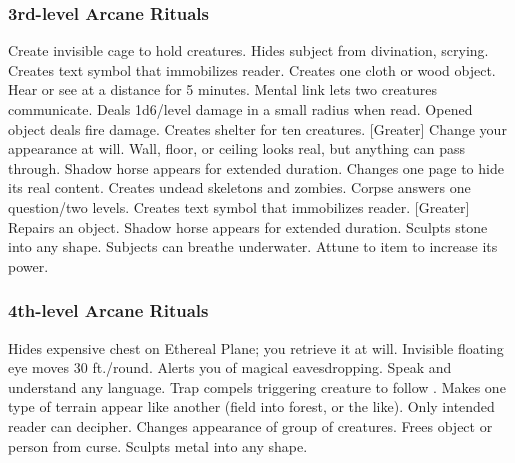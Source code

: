 \subsubsection{3rd-level Arcane Rituals}
\begin{rituallist}
     Create invisible cage to hold creatures.
     Hides subject from divination, scrying.
     Creates text symbol that immobilizes reader.
     Creates one cloth or wood object.
     Hear or see at a distance for 5 minutes.
     Mental link lets two creatures communicate.
     Deals 1d6/level damage in a small radius when read.
     Opened object deals fire damage.
     Creates shelter for ten creatures.
    [Greater] Change your appearance at will.
     Wall, floor, or ceiling looks real, but anything can pass through.
     Shadow horse appears for extended duration.
     Changes one page to hide its real content.
     Creates undead skeletons and zombies.
     Corpse answers one question/two levels.
     Creates text symbol that immobilizes reader.
    [Greater] Repairs an object.
     Shadow horse appears for extended duration.
     Sculpts stone into any shape.
     Subjects can breathe underwater.
     Attune to item to increase its power.
\end{rituallist}

\subsubsection{4th-level Arcane Rituals}
\begin{rituallist}
    \F Hides expensive chest on Ethereal Plane; you retrieve it at will.
     Invisible floating eye moves 30 ft./round.
     Alerts you of magical eavesdropping.
     Speak and understand any language.
     Trap compels triggering creature to follow .
     Makes one type of terrain appear like another (field into forest, or the like).
     Only intended reader can decipher.
     Changes appearance of group of creatures.
     Frees object or person from curse.
     Sculpts metal into any shape.
\end{rituallist}

